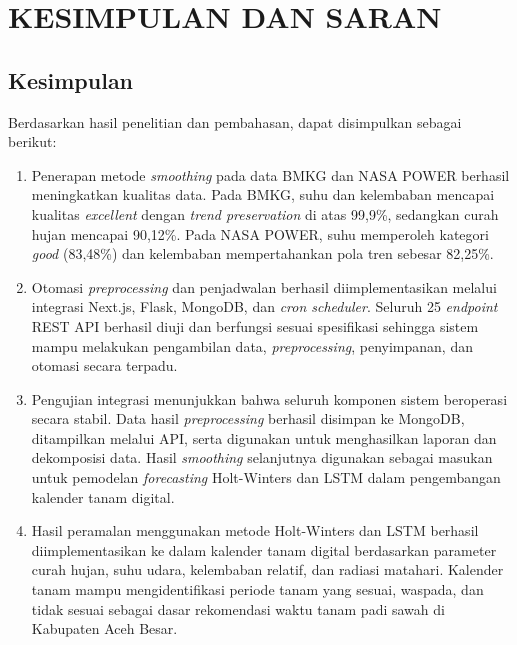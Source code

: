 \chapter{KESIMPULAN DAN SARAN}
\section{Kesimpulan}
Berdasarkan hasil penelitian dan pembahasan, dapat disimpulkan sebagai berikut:
\begin{enumerate}
    \item Penerapan metode \textit{smoothing} pada data BMKG dan NASA POWER berhasil meningkatkan kualitas data. Pada BMKG, suhu dan kelembaban mencapai kualitas \textit{excellent} dengan \textit{trend preservation} di atas 99,9\%, sedangkan curah hujan mencapai 90,12\%. Pada NASA POWER, suhu memperoleh kategori \textit{good} (83,48\%) dan kelembaban mempertahankan pola tren sebesar 82,25\%.

    \item Otomasi \textit{preprocessing} dan penjadwalan berhasil diimplementasikan melalui integrasi Next.js, Flask, MongoDB, dan \textit{cron scheduler}. Seluruh 25 \textit{endpoint} REST API berhasil diuji dan berfungsi sesuai spesifikasi sehingga sistem mampu melakukan pengambilan data, \textit{preprocessing}, penyimpanan, dan otomasi secara terpadu.

    \item Pengujian integrasi menunjukkan bahwa seluruh komponen sistem beroperasi secara stabil. Data hasil \textit{preprocessing} berhasil disimpan ke MongoDB, ditampilkan melalui API, serta digunakan untuk menghasilkan laporan dan dekomposisi data. Hasil \textit{\textit{smoothing}} selanjutnya digunakan sebagai masukan untuk pemodelan \textit{forecasting} Holt-Winters dan LSTM dalam pengembangan kalender tanam digital.

    \item Hasil peramalan menggunakan metode Holt-Winters dan LSTM berhasil diimplementasikan ke dalam kalender tanam digital berdasarkan parameter curah hujan, suhu udara, kelembaban relatif, dan radiasi matahari. Kalender tanam mampu mengidentifikasi periode tanam yang sesuai, waspada, dan tidak sesuai sebagai dasar rekomendasi waktu tanam padi sawah di Kabupaten Aceh Besar.


\end{enumerate}
